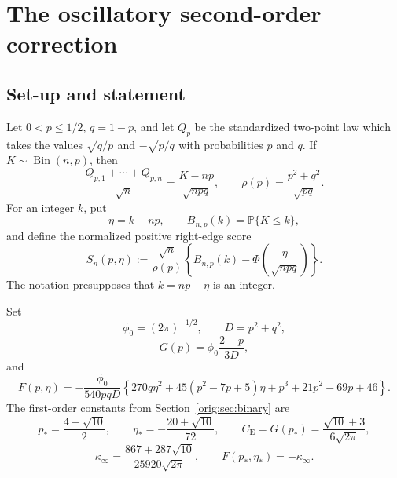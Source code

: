 \documentclass[11pt,a4paper]{article}
\numberwithin{equation}{section}
\theoremstyle{definition}
\theoremstyle{remark}
\newcommand{\Pp}{\mathbb P}
\newcommand{\CE}{C_{\mathrm E}}
\newcommand{\phiZ}{\phi_0}
\begin{document}
\section{The oscillatory second-order correction}\label{bin:section}
\subsection{Set-up and statement}

Let $0<p\le 1/2$, $q=1-p$, and let $Q_p$ be the standardized two-point law
which takes the values $\sqrt{q/p}$ and $-\sqrt{p/q}$ with probabilities
$p$ and $q$.  If $K\sim\operatorname{Bin}(n,p)$, then
\[
 \frac{Q_{p,1}+\cdots+Q_{p,n}}{\sqrt n}
 =\frac{K-np}{\sqrt{npq}},
 \qquad
 \rho(p)=\frac{p^2+q^2}{\sqrt{pq}}.
\]
For an integer $k$, put
\[
 \eta=k-np,
 \qquad
 B_{n,p}(k)=\Pp\{K\le k\},
\]
and define the normalized positive right-edge score
\begin{equation}\label{bin:eq:score}
 S_n(p,\eta)
 :=\frac{\sqrt n}{\rho(p)}
 \left\{B_{n,p}(k)-\Phi\left(\frac{\eta}{\sqrt{npq}}\right)\right\}.
\end{equation}
The notation presupposes that $k=np+\eta$ is an integer.

Set
\[
 \phiZ=(2\pi)^{-1/2},\qquad D=p^2+q^2,
\]
\begin{equation}\label{bin:eq:G}
 G(p)=\phiZ\frac{2-p}{3D},
\end{equation}
and
\begin{equation}\label{bin:eq:F}
 F(p,\eta)=-\frac{\phiZ}{540pqD}
 \left\{
 270q\eta^2+45(p^2-7p+5)\eta+p^3+21p^2-69p+46
 \right\}.
\end{equation}
The first-order constants from Section~\ref{orig:sec:binary} are
\begin{equation}\label{bin:eq:starfirst}
 p_* = \frac{4-\sqrt{10}}2,
 \qquad
 \eta_*=-\frac{20+\sqrt{10}}{72},
 \qquad
 \CE=G(p_*)=\frac{\sqrt{10}+3}{6\sqrt{2\pi}},
\end{equation}
\begin{equation}\label{bin:eq:kappa}
 \kappa_\infty=
 \frac{867+287\sqrt{10}}{25920\sqrt{2\pi}},
 \qquad
 F(p_*,\eta_*)=-\kappa_\infty.
\end{equation}
\end{document}
